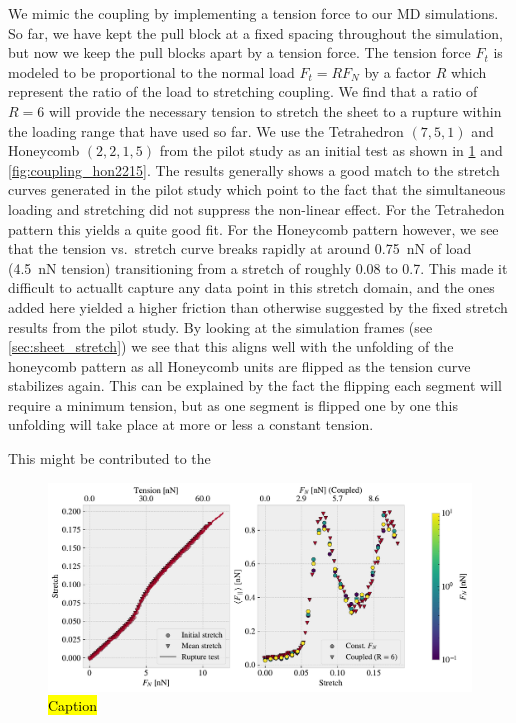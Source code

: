 We mimic the coupling by implementing a tension force to our \acrshort{MD}
simulations. So far, we have kept the pull block at a fixed spacing throughout
the simulation, but now we keep the pull blocks apart by a tension force. The
tension force $F_t$ is modeled to be proportional to the normal load $F_t =
RF_N$ by a factor $R$ which represent the ratio of the load to stretching
coupling. We find that a ratio of $R=6$ will provide the necessary tension to
stretch the sheet to a rupture within the loading range that have used so far.
We use the Tetrahedron $(7,5,1)$ and Honeycomb $(2,2,1,5)$ from the pilot study
as an initial test as shown in \cref{fig:coupling_pop_7_5_1} and
\cref{fig:coupling_hon2215}. The results generally shows a good match to the
stretch curves generated in the pilot study which point to the fact that the
simultaneous loading and stretching did not suppress the non-linear effect. For
the Tetrahedon pattern this yields a quite good fit. For the Honeycomb pattern
however, we see that the tension vs.\ stretch curve breaks rapidly at around
\SI{0.75}{nN} of load (\SI{4.5}{nN} tension) transitioning from a stretch of
roughly 0.08 to 0.7. This made it difficult to actuallt capture any data point
in this stretch domain, and the ones added here yielded a higher friction than
otherwise suggested by the fixed stretch results from the pilot study. By
looking at the simulation frames (see \cref{sec:sheet_stretch}) we see
that this aligns well with the unfolding of the honeycomb pattern as all
Honeycomb units are flipped as the tension curve stabilizes again. This can be
explained by the fact the flipping each segment will require a minimum tension,
but as one segment is flipped one by one this unfolding will take place at more
or less a constant tension. 

This might be contributed to the 


\begin{figure}[H]
  \centering
  \includegraphics[width=0.9\linewidth]{figures/negative_coefficient/manual_coupling_free_pop7_5_1.pdf}
  \caption{\hl{Caption}}
  \label{fig:coupling_pop_7_5_1}
\end{figure}

